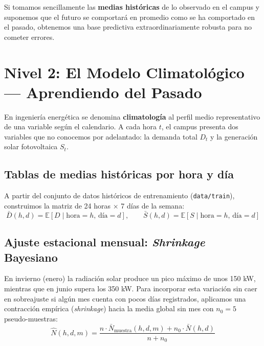 \documentclass[a4paper,11pt]{article}
\begin{document}
Si tomamos sencillamente las \textbf{medias históricas} de lo observado en el campus y suponemos que el futuro se comportará en promedio como se ha comportado en el pasado, obtenemos una base predictiva extraordinariamente robusta para no cometer errores.

\newpage

\section{Nivel 2: El Modelo Climatológico — Aprendiendo del Pasado}

En ingeniería energética se denomina \textbf{climatología} al perfil medio representativo de una variable según el calendario. A cada hora $t$, el campus presenta dos variables que no conocemos por adelantado: la demanda total $D_t$ y la generación solar fotovoltaica $S_t$.

\subsection{Tablas de medias históricas por hora y día}
A partir del conjunto de datos históricos de entrenamiento (\texttt{data/train}), construimos la matriz de 24 horas $\times$ 7 días de la semana:
\begin{equation}
\bar{D}(h, d) = \mathbb{E}[D \mid \text{hora}=h,\, \text{día}=d], \qquad
\bar{S}(h, d) = \mathbb{E}[S \mid \text{hora}=h,\, \text{día}=d]
\end{equation}

\subsection{Ajuste estacional mensual: \emph{Shrinkage} Bayesiano}
En invierno (enero) la radiación solar produce un pico máximo de unos 150 kW, mientras que en junio supera los 350 kW. Para incorporar esta variación sin caer en sobreajuste si algún mes cuenta con pocos días registrados, aplicamos una contracción empírica (\emph{shrinkage}) hacia la media global sin mes con $n_0 = 5$ pseudo-muestras:
\begin{equation}
\hat{N}(h, d, m) = \frac{n \cdot \bar{N}_{\text{muestra}}(h, d, m) + n_0 \cdot \bar{N}(h, d)}{n + n_0}
\end{equation}
\end{document}
